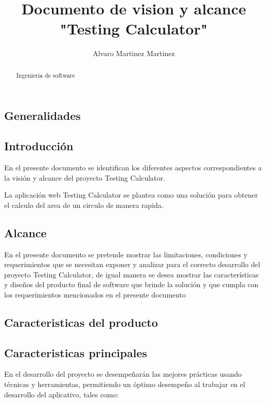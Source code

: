 \documentclass{article}
\title{Documento de vision y alcance "Testing Calculator"}
\author{Alvaro Martinez Martinez}
\begin{document}
\maketitle

\begin{abstract}
Ingenieria de software
\end{abstract}

\begin{center}
\section{Generalidades}
\end{center}

\subsection{Introducción}

En el presente documento se identifican los diferentes aspectos
correspondientes a la visión y alcance del proyecto Testing Calculator.

La aplicación web Testing Calculator se plantea como una solución para obtener el calculo del area de un circulo de manera rapida.

\subsection{Alcance}
En el presente documento se pretende mostrar las limitaciones, condiciones y
requerimientos que se necesitan exponer y analizar para el correcto desarrollo
del proyecto Testing Calculator, de igual manera se desea mostrar las
características y diseños del producto final de software que brinde la solución y que cumpla con los requerimientos mencionados en el presente documento

\begin{center}
\section{Caracteristicas del producto}
\end{center}

\subsection{Caracteristicas principales}

En el desarrollo del proyecto se desempeñarán las mejores prácticas usando
técnicas y herramientas, permitiendo un óptimo desempeño al trabajar en el desarrollo del aplicativo, tales como:
\end{document}
